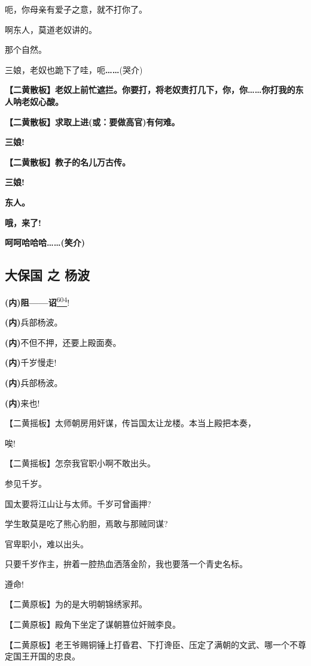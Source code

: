呃，你母亲有爱子之意，就不打你了。

啊东人，莫道老奴讲的。

那个自然。

三娘，老奴也跪下了哇，呃\textbf{\ldots{}\ldots{}}(哭介)

\textbf{【二黄散板】老奴上前忙遮拦。你要打，将老奴责打几下，你，你\ldots{}\ldots{}你打我的东人呐老奴心酸。}

\textbf{【二黄散板】求取上进(或：要做高官)有何难。}

\textbf{三娘!}

\textbf{【二黄散板】教子的名儿万古传。}

\textbf{三娘!}

\textbf{东人。}

\textbf{哦，来了!}

\textbf{呵呵哈哈哈\ldots{}\ldots{}(笑介)}

\newpage
\hypertarget{ux5927ux4fddux56fd-ux4e4b-ux6768ux6ce2}{%
\subsection{大保国 之
杨波}\label{ux5927ux4fddux56fd-ux4e4b-ux6768ux6ce2}}

\textbf{(内)阻------诏}\protect\hyperlink{fn604}{\textsuperscript{604}}!

\textbf{(内)}兵部杨波。

\textbf{(内)}不但不押，还要上殿面奏。

\textbf{(内)}千岁慢走!

\textbf{(内)}兵部杨波。

\textbf{(内)}来也!

【二黄摇板】太师朝房用奸谋，传旨国太让龙楼。本当上殿把本奏，

唉!

【二黄摇板】怎奈我官职小啊不敢出头。

参见千岁。

国太要将江山让与太师。千岁可曾画押?

学生敢莫是吃了熊心豹胆，焉敢与那贼同谋?

官卑职小，难以出头。

只要千岁作主，拚着一腔热血洒落金阶，我也要落一个青史名标。

遵命!

【二黄原板】为的是大明朝锦绣家邦。

【二黄原板】殿角下坐定了谋朝篡位奸贼李良。

【二黄原板】老王爷赐铜锤上打昏君、下打谗臣、压定了满朝的文武、哪一个不尊定国王开国的忠良。

